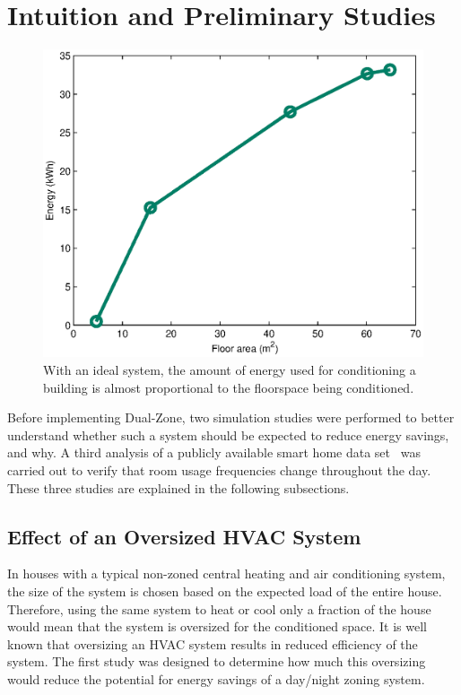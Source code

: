 \section{Intuition and Preliminary Studies}
\label{sec:intuition}

\begin{figure}[t]
  \centering
  \includegraphics[width=0.6\columnwidth]{fig/areaVsEnergy}
  \caption[Effect of Floorspace on Energy Usage]{With an ideal system, the
    amount of energy used for conditioning a building is almost proportional to
    the floorspace being conditioned.}
  \label{fig:areaVsEnergy}
\end{figure}

Before implementing Dual-Zone, two simulation studies were performed to
better understand whether such a system should be expected to reduce energy
savings, and why. A third analysis of a publicly available smart home data
set~\cite{kasterenUbi2008} was carried out to verify that room usage frequencies
change throughout the day.  These three studies are explained in the following
subsections.

\subsection{Effect of an Oversized HVAC System}
\label{subsec:oversizing}

In houses with a typical non-zoned central heating and air conditioning system,
the size of the system is chosen based on the expected load of the entire house.
Therefore, using the same system to heat or cool only a fraction of the house
would mean that the system is oversized for the conditioned space.  It is well
known that oversizing an HVAC system results in reduced efficiency of the
system.  The first study was designed to determine how much this oversizing
would reduce the potential for energy savings of a day/night zoning system.

